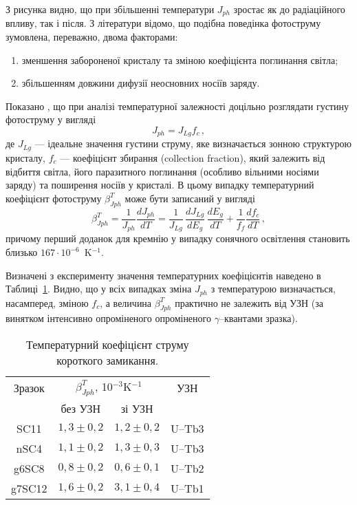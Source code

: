 З рисунка видно, що при збільшенні температури $J_{ph}$ зростає як до радіаційного впливу, так і після.
З літератури \cite{Faren,SCTemp:PP11,SCTemp:SEMSC140} відомо, що
подібна поведінка фотоструму зумовлена, переважно, двома факторами:
\begin{enumerate}[label=\arabic*),leftmargin=0em,itemindent=1.5em]
\item зменшення забороненої кристалу та зміною коефіцієнта поглинання світла;
\item збільшенням довжини дифузії неосновних носіїв заряду.
\end{enumerate}
Показано \cite{SCTemp:PP11,SCTemp:SEMSC140}, що при аналізі температурної залежності доцільно
розглядати густину фотоструму у вигляді
\begin{equation}
\label{eqIscIdeal}
J_{ph}=J_{Lg}f_c\,,
\end{equation}
де
$J_{Lg}$ --- ідеальне значення густини струму, яке визначається
зонною структурою кристалу,
$f_c$ --- коефіцієнт збирання (collection fraction),
який залежить від відбиття світла, його паразитного поглинання (особливо вільними носіями заряду)
та поширення носіїв у кристалі.
В цьому випадку температурний коефіцієнт фотоструму $\beta^T_{Jph}$ може бути записаний у вигляді
\begin{equation}
\label{eqIscTempKoef}
\beta^T_{Jph}=\frac{1}{J_{ph}}\frac{dJ_{ph}}{dT}=\frac{1}{J_{Lg}}\,\frac{dJ_{Lg}}{dE_g}\,\frac{dE_g}{dT}+\frac{1}{f_{f}}\frac{df_{c}}{dT}\,,
\end{equation}
причому перший доданок для кремнію у випадку сонячного освітлення становить близько $167\cdot10^{-6}$~K$^{-1}$.

Визначені з експерименту значення температурних коефіцієнтів наведено в Таблиці~\ref{tabIscT}.
Видно, що у всіх випадках зміна $J_{ph}$ з температурою визначається, насамперед,
зміною $f_c$, а величина $\beta^T_{Jph}$ практично не залежить від УЗН (за винятком інтенсивно опроміненого опроміненого $\gamma$--квантами зразка).

\begin{table}
\caption{\label{tabIscT}Температурний коефіцієнт струму короткого замикання.
}
\center
\begin{tabular}{|c|c|c|c|}
\hline
Зразок&\multicolumn{2}{c|}{$\beta^T_{Jph}$, 10$^{-3}$K$^{-1}$}&УЗН\\ \cline{2-3}
&без УЗН & зі УЗН&\\ \hline
SC11&$1,3\pm0,2$&$1,2\pm0,2$&U--Tb3\\ \hline
nSC4&$1,1\pm0,2$&$1,3\pm0,3$&U--Tb3\\ \hline
g6SC8&$0,8\pm0,2$&$0,6\pm0,1$&U--Tb2\\ \hline
g7SC12&$1,6\pm0,2$&$3,1\pm0,4$&U--Tb1\\ \hline
\end{tabular}
\end{table}

